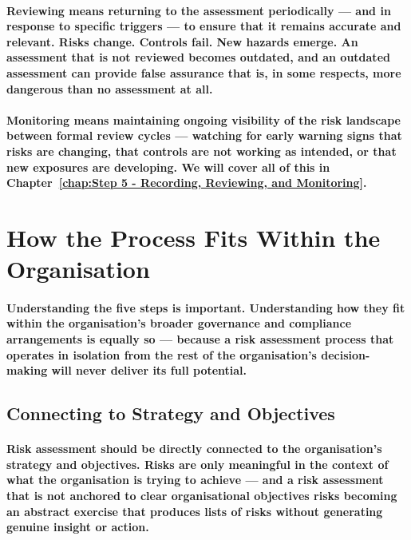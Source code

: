 \paragraph{\textbf{Reviewing} means returning to the assessment periodically — and in response to specific triggers — to ensure that it remains accurate and relevant. Risks change. Controls fail. New hazards emerge. An assessment that is not reviewed becomes outdated, and an outdated assessment can provide false assurance that is, in some respects, more dangerous than no assessment at all.}
\paragraph{Monitoring means maintaining ongoing visibility of the risk landscape between formal review cycles — watching for early warning signs that risks are changing, that controls are not working as intended, or that new exposures are developing. We will cover all of this in Chapter~\ref{chap:Step 5 - Recording, Reviewing, and Monitoring}.}

\section{How the Process Fits Within the Organisation}
\paragraph{Understanding the five steps is important. Understanding how they fit within the organisation's broader governance and compliance arrangements is equally so — because a risk assessment process that operates in isolation from the rest of the organisation's decision-making will never deliver its full potential.}

\subsection{Connecting to Strategy and Objectives}
\paragraph{Risk assessment should be directly connected to the organisation's strategy and objectives. Risks are only meaningful in the context of what the organisation is trying to achieve — and a risk assessment that is not anchored to clear organisational objectives risks becoming an abstract exercise that produces lists of risks without generating genuine insight or action.}
